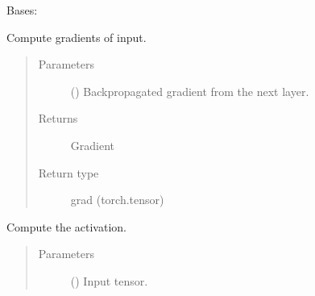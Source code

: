 \documentclass[letterpaper,10pt,english,openany,oneside]{sphinxmanual}
\begin{document}
\begin{fulllineitems}
\label{\detokenize{nn:nn.activation.Activation}}
Bases: {\hyperref[\detokenize{nn:nn.module.Module}]{}}

\begin{fulllineitems}
\label{\detokenize{nn:nn.activation.Activation.backward}}
Compute gradients of input.
\begin{quote}\begin{description}
\item[{Parameters}] \leavevmode
{} () \textendash{} Backpropagated gradient from the next layer.

\item[{Returns}] \leavevmode
Gradient

\item[{Return type}] \leavevmode
grad (torch.tensor)

\end{description}\end{quote}

\end{fulllineitems}


\begin{fulllineitems}
\label{\detokenize{nn:nn.activation.Activation.forward}}
Compute the activation.
\begin{quote}\begin{description}
\item[{Parameters}] \leavevmode
{} () \textendash{} Input tensor.

\end{description}\end{quote}

\end{fulllineitems}


\end{fulllineitems}
\end{document}
